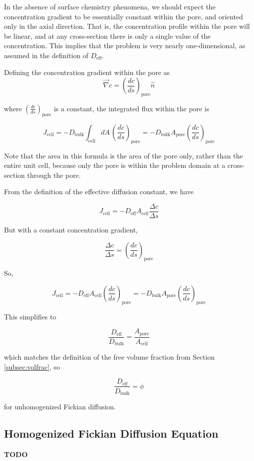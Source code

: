 \documentclass{article}
\begin{document}
In the absence of surface chemistry phenomena,
we should expect the concentration gradient
to be essentially constant within the pore, and oriented only in the axial direction.
That is, the concentration profile within the pore will be linear,
and at any cross-section there is only a single value of the concentration.
This implies that the problem is very nearly one-dimensional,
as assumed in the definition of $D_{\text{eff}}$.

Defining the concentration gradient within the pore as
$$\vec{\nabla} c = \left(\frac{dc}{ds}\right)_{\text{pore}} \hat{n}$$

where $\left(\frac{dc}{ds}\right)_{\text{pore}}$ is a constant,
the integrated flux within the pore is

$$J_\text{cell} = -D_\text{bulk} \int_\text{cell} dA\, \left(\frac{dc}{ds}\right)_{\text{pore}}
 = -D_\text{bulk} A_\text{pore} \left(\frac{dc}{ds}\right)_{\text{pore}}$$

Note that the area in this formula is the area of the pore only,
rather than the entire unit cell, because only the pore is within the problem domain
at a cross-section through the pore.

From the definition of the effective diffusion constant, we have

$$J_{\text{cell}} = - D_{\text{eff}} A_{\text{cell}} \frac{\Delta c}{\Delta s}$$

But with a constant concentration gradient,

$$\frac{\Delta c}{\Delta s} = \left(\frac{dc}{ds}\right)_{\text{pore}}$$

So,

$$J_{\text{cell}} = - D_{\text{eff}} A_{\text{cell}} \left(\frac{dc}{ds}\right)_{\text{pore}}
 = -D_\text{bulk} A_\text{pore} \left(\frac{dc}{ds}\right)_{\text{pore}}$$

This simplifies to

$$\frac{D_\text{eff}}{D_\text{bulk}} = \frac{A_\text{pore}}{A_\text{cell}}$$

which matches the definition of the free volume fraction from Section \ref{subsec:volfrac}, so

$$\frac{D_\text{eff}}{D_\text{bulk}} = \phi$$

for unhomogenized Fickian diffusion.

\subsection{Homogenized Fickian Diffusion Equation}\label{subsec:hom_fick}

\textbf{TODO}
\end{document}
